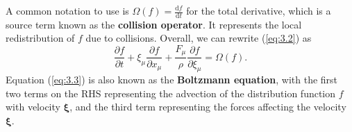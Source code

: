 \documentclass[a4paper, 11pt]{report}
\begin{document}

A common notation to use is $\Omega(f) = \frac{\mathrm{d}f}{\mathrm{d}t}$ for the total derivative, which is a source term known as the \textbf{collision operator}. It represents the local redistribution of $f$ due to collisions. Overall, we can rewrite (\ref{eq:3.2}) as
\begin{equation}
     \frac{\partial f}{\partial t} + \xi_\mu\frac{\partial f}{\partial x_\mu} + \frac{F_\mu}{\rho} \frac{\partial f}{\partial \xi_\mu} = \Omega(f). \label{eq:3.4}
\end{equation}
Equation (\ref{eq:3.3}) is also known as the \textbf{Boltzmann equation}, with the first two terms on the RHS representing the advection of the distribution function $f$ with velocity $\bm{\xi}$, and the third term representing the forces affecting the velocity $\bm{\xi}$. 
\end{document}
